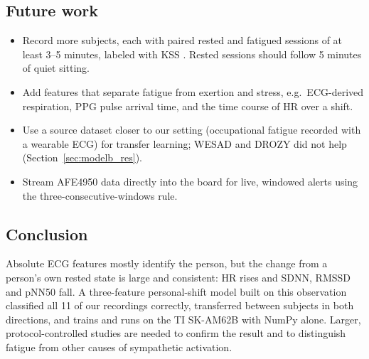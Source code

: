 \documentclass[11pt]{article}
\begin{document}
\subsection{Future work}
\begin{itemize}
  \item Record more subjects, each with paired rested and fatigued sessions of at least 3--5 minutes,
  labeled with KSS \cite{kss1990}. Rested sessions should follow 5 minutes of quiet sitting.
  \item Add features that separate fatigue from exertion and stress, e.g.\ ECG-derived respiration,
  PPG pulse arrival time, and the time course of HR over a shift.
  \item Use a source dataset closer to our setting (occupational fatigue recorded with a wearable ECG) for transfer learning; WESAD and DROZY did not help (Section~\ref{sec:modelb_res}).
  \item Stream AFE4950 data directly into the board for live, windowed alerts using the
  three-consecutive-windows rule.
\end{itemize}

\subsection{Conclusion}
Absolute ECG features mostly identify the person, but the change from a person's own rested state is
large and consistent: HR rises and SDNN, RMSSD and pNN50 fall. A three-feature personal-shift model built on
this observation classified all 11 of our recordings correctly, transferred between subjects in both
directions, and trains and runs on the TI SK-AM62B with NumPy alone. Larger, protocol-controlled studies
are needed to confirm the result and to distinguish fatigue from other causes of sympathetic activation.
\end{document}
